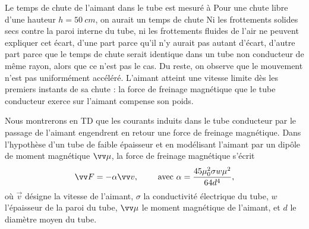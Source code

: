 \begin{quest}
{
Le temps de chute de l’aimant dans le tube est mesuré à 
Pour une chute libre d’une hauteur $h=\SI{50}{cm}$, on aurait un temps de chute 
 Ni les frottements solides secs contre la paroi interne du tube, ni les frottements fluides de l'air ne peuvent expliquer cet écart, d’une part parce qu’il n’y aurait pas autant d’écart, d’autre part parce que le temps de chute serait identique dans un tube non conducteur de même rayon, alors que ce n’est pas le cas. Du reste, on observe que le mouvement n'est pas uniformément accéléré. L'aimant atteint une vitesse limite dès les premiers instants de sa chute : la force de freinage magnétique que le tube conducteur exerce sur l'aimant compense son poids.
}
\end{quest}


Nous montrerons en TD que les courants induits dans le tube conducteur par le passage de l'aimant engendrent en retour une force de freinage magnétique. Dans l'hypothèse d'un tube de faible épaisseur et en modélisant l'aimant par un dipôle de moment magnétique $\M$, la force de freinage magnétique s'écrit
\begin{equation}
  \F = -\alpha \Vec{v},  \qquad  \text{ avec }\alpha = \dfrac{45 \mu_{0}^{2}\sigma w \mu^{2}}{64 d^{4}},
\end{equation}
où $\Vec{v}$ désigne la vitesse de l'aimant, $\sigma$ la conductivité électrique du tube, $w$ l'épaisseur de la paroi du tube, $\M$ le moment magnétique de l'aimant, et $d$ le diamètre moyen du tube.

